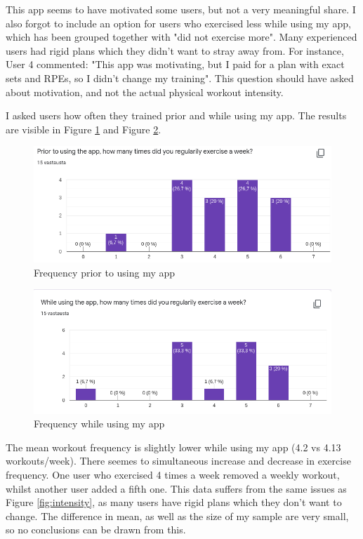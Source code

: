 \documentclass{l4proj}
\begin{document}
This app seems to have motivated some users, but not a very meaningful share. I also forgot to include an option for users who exercised less while using my app, which has been grouped together with "did not exercise more". Many experienced users had rigid plans which they didn't want to stray away from. For instance, User 4 commented: "This app was motivating, but I paid for a plan with exact sets and RPEs, so I didn't change my training". This question should have asked about motivation, and not the actual physical workout intensity.

I asked users how often they trained prior and while using my app. The results are visible in Figure \ref{fig:prior_frequency} and Figure \ref{fig:while_frequency}.
\begin{figure}[H]
    \centering
    \includegraphics[width=1.0\linewidth]{prior_frequency.png}    
    \caption{Frequency prior to using my app}
    \label{fig:prior_frequency} 
\end{figure}

\begin{figure}[H]
    \centering
    \includegraphics[width=1.0\linewidth]{while_frequency.png}    
    \caption{Frequency while using my app}
    \label{fig:while_frequency} 
\end{figure}

The mean workout frequency is slightly lower while using my app (4.2 vs 4.13 workouts/week). There seemes to simultaneous increase and decrease in exercise frequency. One user who exercised 4 times a week removed a weekly workout, whilst another user added a fifth one. This data suffers from the same issues as Figure \ref{fig:intensity}, as many users have rigid plans which they don't want to change. The difference in mean, as well as the size of my sample are very small, so no conclusions can be drawn from this.
\end{document}
